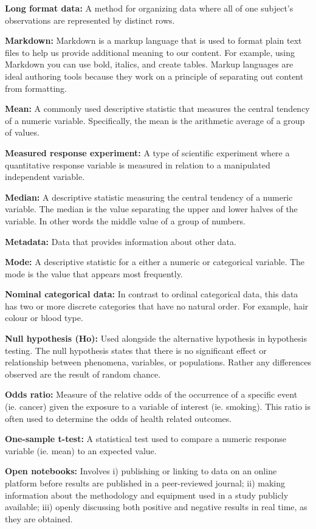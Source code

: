 \documentclass[
]{book}
\begin{document}
\textbf{Long format data:} A method for organizing data where all of one subject's observations are represented by distinct rows.

\textbf{Markdown:} Markdown is a markup language that is used to format plain text files to help us provide additional meaning to our content. For example, using Markdown you can use bold, italics, and create tables. Markup languages are ideal authoring tools because they work on a principle of separating out content from formatting.

\textbf{Mean:} A commonly used descriptive statistic that measures the central tendency of a numeric variable. Specifically, the mean is the arithmetic average of a group of values.

\textbf{Measured response experiment:} A type of scientific experiment where a quantitative response variable is measured in relation to a manipulated independent variable.

\textbf{Median:} A descriptive statistic measuring the central tendency of a numeric variable. The median is the value separating the upper and lower halves of the variable. In other words the middle value of a group of numbers.

\textbf{Metadata:} Data that provides information about other data.

\textbf{Mode:} A descriptive statistic for a either a numeric or categorical variable. The mode is the value that appears most frequently.

\textbf{Nominal categorical data:} In contrast to ordinal categorical data, this data has two or more discrete categories that have no natural order. For example, hair colour or blood type.

\textbf{Null hypothesis (Ho):} Used alongside the alternative hypothesis in hypothesis testing. The null hypothesis states that there is no significant effect or relationship between phenomena, variables, or populations. Rather any differences observed are the result of random chance.

\textbf{Odds ratio:} Measure of the relative odds of the occurrence of a specific event (ie. cancer) given the exposure to a variable of interest (ie. smoking). This ratio is often used to determine the odds of health related outcomes.

\textbf{One-sample t-test:} A statistical test used to compare a numeric response variable (ie. mean) to an expected value.

\textbf{Open notebooks:} Involves i) publishing or linking to data on an online platform before results are published in a peer-reviewed journal; ii) making information about the methodology and equipment used in a study publicly available; iii) openly discussing both positive and negative results in real time, as they are obtained.
\end{document}
